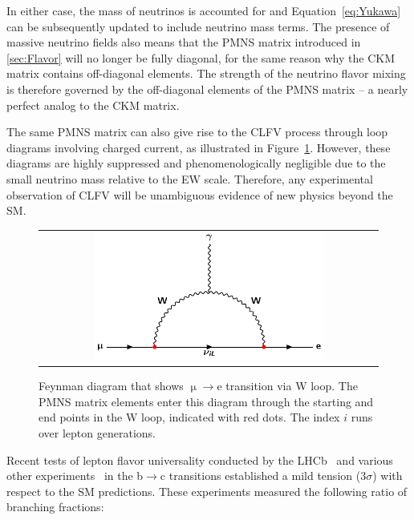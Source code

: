 In either case, the mass of neutrinos is accounted for and Equation~\ref{eq:Yukawa} can be subsequently updated to include neutrino mass terms. The presence of massive neutrino fields also means that the \ac{PMNS} matrix introduced in \autoref{sec:Flavor} will no longer be fully diagonal, for the same reason why the \ac{CKM} matrix contains off-diagonal elements. The strength of the neutrino flavor mixing is therefore governed by the off-diagonal elements of the \ac{PMNS} matrix -- a nearly perfect analog to the \ac{CKM} matrix. 

The same \ac{PMNS} matrix can also give rise to the \ac{CLFV} process through loop diagrams involving charged current, as illustrated in Figure~\ref{fig:mutoe}. However, these diagrams are highly suppressed and phenomenologically negligible due to the small neutrino mass relative to the \ac{EW} scale. Therefore, any experimental observation of \ac{CLFV} will be unambiguous evidence of new physics beyond the \ac{SM}.

\begin{figure}[tbh!]
 \begin{center}
 \begin{tabular}{c}
 \includegraphics[width=0.7\textwidth]{figures/Part1/BSM/mutoe}
 \end{tabular}
 \caption{Feynman diagram that shows $\upmu\rightarrow$e transition via W loop. The \ac{PMNS} matrix elements enter this diagram through the starting and end points in the W loop, indicated with red dots. The index $i$ runs over lepton generations.}
 \label{fig:mutoe}
 \end{center}
\end{figure}

Recent tests of lepton flavor universality conducted by the \ac{LHCb}~\cite{LHCb:2023zxo} and various other experiments~\cite{HFLAV} in the b$\rightarrow$c transitions established a mild tension (3$\sigma$) with respect to the \ac{SM} predictions. These experiments measured the following ratio of branching fractions:

